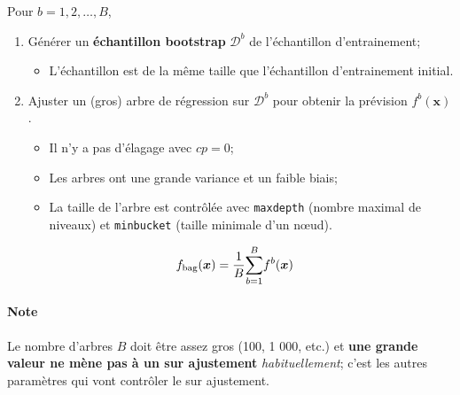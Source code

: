 \documentclass[10pt, french]{article}
\begin{document}
\begin{multicols*}{3}
\begin{algo2}
Pour $b = 1, 2, \dots, B$,
\begin{enumerate}
	\item	Générer un \textbf{échantillon bootstrap} $\mathcal{D}^{b}$ de l'échantillon d'entrainement;
		\begin{itemize}[leftmargin = *]
		\item	L'échantillon est de la même taille que l'échantillon d'entrainement initial.
		\end{itemize}
	\item	Ajuster un (gros) arbre de régression sur $\mathcal{D}^{b}$ pour obtenir la prévision $f^{b}(\bm{x})$.
		\begin{itemize}[leftmargin = *]
		\item	Il n'y a pas d'élagage avec $cp = 0$;
		\item	Les arbres ont une grande variance et un faible biais;
		\item	La taille de l'arbre est contrôlée avec \texttt{maxdepth} (nombre maximal de niveaux) et \texttt{minbucket} (taille minimale d'un nœud).
		\end{itemize}
		\begin{align*}
		f_{\text{bag}}(\bm{x})
		&=	\frac{1}{B} \overset{B}{\underset{b = 1}{\sum}} f^{b}(\bm{x})
		\end{align*}
\end{enumerate}

\paragraph{Note}	Le nombre d'arbres $B$ doit être assez gros (100, 1 000, etc.) et \textbf{une grande valeur ne mène pas à un sur ajustement} \textit{habituellement}; c'est les autres paramètres qui vont contrôler le sur ajustement.
\end{algo2}


\end{multicols*}
\end{document}
